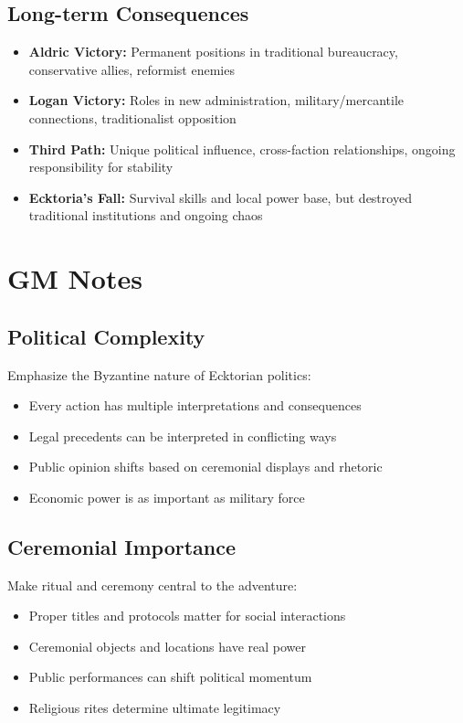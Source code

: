 \documentclass[11pt]{article}
\begin{document}
\subsection{Long-term Consequences}
\begin{itemize}
\item \textbf{Aldric Victory:} Permanent positions in traditional bureaucracy, conservative allies, reformist enemies
\item \textbf{Logan Victory:} Roles in new administration, military/mercantile connections, traditionalist opposition
\item \textbf{Third Path:} Unique political influence, cross-faction relationships, ongoing responsibility for stability
\item \textbf{Ecktoria's Fall:} Survival skills and local power base, but destroyed traditional institutions and ongoing chaos
\end{itemize}

\section{GM Notes}

\subsection{Political Complexity}
Emphasize the Byzantine nature of Ecktorian politics:
\begin{itemize}
\item Every action has multiple interpretations and consequences
\item Legal precedents can be interpreted in conflicting ways
\item Public opinion shifts based on ceremonial displays and rhetoric
\item Economic power is as important as military force
\end{itemize}

\subsection{Ceremonial Importance}
Make ritual and ceremony central to the adventure:
\begin{itemize}
\item Proper titles and protocols matter for social interactions
\item Ceremonial objects and locations have real power
\item Public performances can shift political momentum
\item Religious rites determine ultimate legitimacy
\end{itemize}
\end{document}

